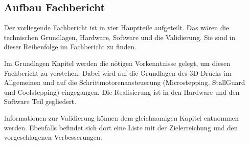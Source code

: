 \subsection{Aufbau Fachbericht}
\label{sec:AufbauFachbericht}

Der vorliegende Fachbericht ist in vier Hauptteile aufgeteilt. Das wären die technischen Grundlagen, Hardware, Software und die Validierung. Sie sind in dieser Reihenfolge im Fachbericht zu finden.

Im Grundlagen Kapitel werden die nötigen Vorkenntnisse gelegt, um diesen Fachbericht zu verstehen. Dabei wird auf die Grundlagen des 3D-Drucks im Allgemeinen und auf die Schrittmotorenansteuerung (Microstepping, StallGuard und Coolstepping) eingegangen.
Die Realisierung ist in den Hardware und den Software Teil gegliedert. 

Informationen zur Validierung können dem gleichnamigen Kapitel entnommen werden. Ebenfalls befindet sich dort eine Liste mit der Zielerreichung und den vorgeschlagenen Verbesserungen.